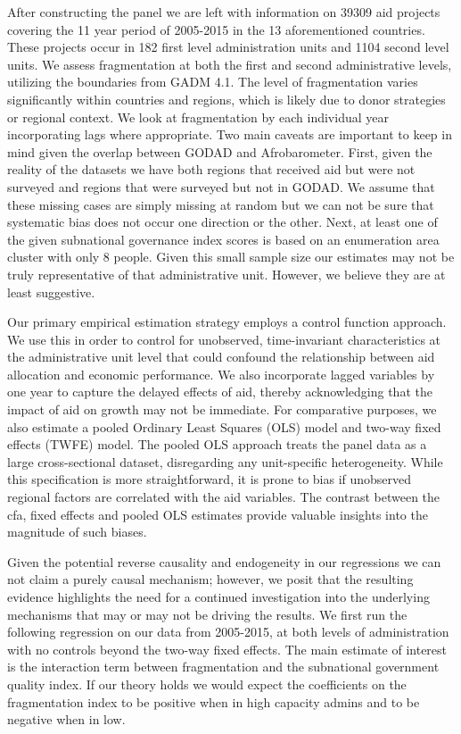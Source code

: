 \documentclass[11pt]{article}
\begin{document}
After constructing the panel we are left with information on 39309 aid projects covering the 11 year period of 2005-2015 in the 13 aforementioned countries. These projects occur in 182 first level administration units and 1104 second level units. We assess fragmentation at both the first and second administrative levels, utilizing the boundaries from GADM 4.1. The level of fragmentation varies significantly within countries and regions, which is likely  due to donor strategies or regional context. We look at fragmentation by each individual year incorporating lags where appropriate. Two main caveats are important to keep in mind  given the overlap between GODAD and Afrobarometer. First, given the reality of the datasets we have both regions that received aid but were not surveyed and regions that were surveyed but not in GODAD. We assume that these missing cases are simply missing at random but we can not be sure that systematic bias does not occur one direction or the other. Next, at least one of the given subnational governance index scores is based on an enumeration area cluster with only 8 people. Given this small sample size our estimates may not be truly representative of that administrative unit.  However, we believe they are at least suggestive. 

Our primary empirical estimation strategy employs a control function approach. We use this in order to control for unobserved, time-invariant characteristics at the administrative unit level that could confound the relationship between aid allocation and economic performance. We also incorporate lagged variables by one year to capture the delayed effects of aid, thereby acknowledging that the impact of aid on growth may not be immediate. For comparative purposes, we also estimate a pooled Ordinary Least Squares (OLS) model and two-way fixed effects (TWFE) model. The pooled OLS approach treats the panel data as a large cross-sectional dataset, disregarding any unit-specific heterogeneity. While this specification is more straightforward, it is prone to bias if unobserved regional factors are correlated with the aid variables. The contrast between the cfa, fixed effects and pooled OLS estimates provide valuable insights into the magnitude of such biases.

Given the potential reverse causality and endogeneity in our regressions we can not claim a purely causal mechanism; however, we posit that the resulting evidence highlights the need for a continued investigation into the underlying mechanisms that may or may not be driving the results. We first run the following regression on our data from 2005-2015, at both levels of administration with no controls beyond the two-way fixed effects. The main estimate of interest is the interaction term between fragmentation and the subnational government quality index. If our theory holds we would expect the coefficients on the fragmentation index to be positive when in high capacity admins and to be negative when in low. 
\end{document}
